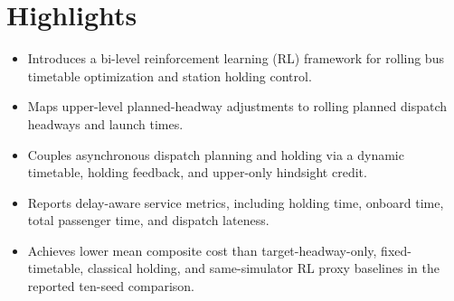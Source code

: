 
\section*{Highlights}

\begin{itemize}[leftmargin=*]
  \item Introduces a bi-level reinforcement learning (RL) framework for rolling bus timetable optimization and station holding control.
  \item Maps upper-level planned-headway adjustments to rolling planned dispatch headways and launch times.
  \item Couples asynchronous dispatch planning and holding via a dynamic timetable, holding feedback, and upper-only hindsight credit.
  \item Reports delay-aware service metrics, including holding time, onboard time, total passenger time, and dispatch lateness.
  \item Achieves lower mean composite cost than target-headway-only, fixed-timetable, classical holding, and same-simulator RL proxy baselines in the reported ten-seed comparison.
\end{itemize}
